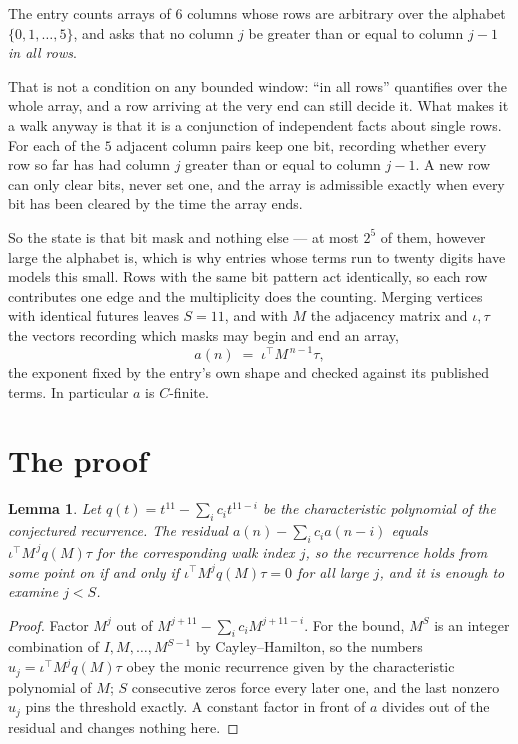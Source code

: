 \documentclass[11pt,a4paper]{article}
\theoremstyle{plain}
\newtheorem{lemma}[theorem]{Lemma}
\theoremstyle{definition}
\begin{document}
The entry counts arrays of $6$ columns whose rows are arbitrary over the alphabet $\{0,1,\dots,5\}$, and asks that no column $j$ be greater than or equal to column $j-1$ \emph{in all rows}.

That is not a condition on any bounded window: ``in all rows'' quantifies over the whole array, and a row arriving at the very end can still decide it. What makes it a walk anyway is that it is a conjunction of independent facts about single rows. For each of the $5$ adjacent column pairs keep one bit, recording whether every row so far has had column $j$ greater than or equal to column $j-1$. A new row can only clear bits, never set one, and the array is admissible exactly when every bit has been cleared by the time the array ends.

So the state is that bit mask and nothing else --- at most $2^{5}$ of them, however large the alphabet is, which is why entries whose terms run to twenty digits have models this small. Rows with the same bit pattern act identically, so each row contributes one edge and the multiplicity does the counting. Merging vertices with identical futures leaves $S=11$, and with $M$ the adjacency matrix and $\iota,\tau$ the vectors recording which masks may begin and end an array,
\[
a(n)\;=\;\iota^{\!\top}M^{\,n-1}\tau ,
\]
the exponent fixed by the entry's own shape and checked against its published terms. In
particular $a$ is $C$-finite.

\section{The proof}

\begin{lemma}\label{lem:crit}
Let $q(t)=t^{11}-\sum_i c_it^{11-i}$ be the characteristic polynomial of the
conjectured recurrence. The residual $a(n)-\sum_ic_ia(n-i)$ equals
$\iota^{\!\top}M^{\,j}q(M)\tau$ for the corresponding walk index $j$, so the recurrence
holds from some point on if and only if $\iota^{\!\top}M^{j}q(M)\tau=0$ for all large $j$,
and it is enough to examine $j<S$.
\end{lemma}

\begin{proof}
Factor $M^{j}$ out of $M^{j+11}-\sum_ic_iM^{j+11-i}$. For the bound, $M^{S}$
is an integer combination of $I,M,\dots,M^{S-1}$ by Cayley--Hamilton, so the numbers
$u_j=\iota^{\!\top}M^{j}q(M)\tau$ obey the monic recurrence given by the characteristic
polynomial of $M$; $S$ consecutive zeros force every later one, and the last nonzero $u_j$
pins the threshold exactly. A constant factor in front of $a$ divides out of the residual and
changes nothing here.
\end{proof}
\end{document}
